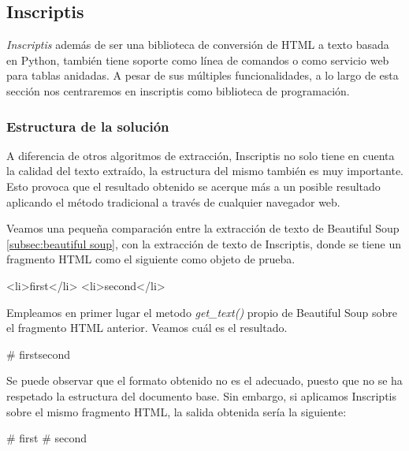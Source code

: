 \subsection{Inscriptis}
\label{subsec:inscriptis}

\emph{Inscriptis} \cite{inscriptis} además de ser una biblioteca de conversión de HTML a texto basada en
Python, también tiene soporte como línea de comandos o como servicio web para tablas anidadas. A pesar de
sus múltiples funcionalidades, a lo largo de esta sección nos centraremos en inscriptis como biblioteca
de programación.

\subsubsection{Estructura de la solución}
\label{subsubsec:estructura de la solucion}

A diferencia de otros algoritmos de extracción, Inscriptis no solo tiene en cuenta la calidad del texto
extraído, la estructura del mismo también es muy importante. Esto provoca que el resultado obtenido se
acerque más a un posible resultado aplicando el método tradicional a través de cualquier navegador web.

Veamos una pequeña comparación entre la extracción de texto de Beautiful Soup \ref{subsec:beautiful soup}, 
con la extracción de texto de Inscriptis, donde se tiene un fragmento HTML como el siguiente como objeto 
de prueba.

\begin{Schunk}
  \begin{Soutput}
      <li>first</li>
      <li>second</li>
  \end{Soutput}
\end{Schunk}

Empleamos en primer lugar el metodo \emph{get\_text()} propio de Beautiful Soup sobre el fragmento HTML
anterior. Veamos cuál es el resultado.

\begin{Schunk}
  \begin{Soutput}
    # firstsecond
  \end{Soutput}
\end{Schunk}

Se puede observar que el formato obtenido no es el adecuado, puesto que no se ha respetado la estructura
del documento base. Sin embargo, si aplicamos Inscriptis sobre el mismo fragmento HTML, la salida obtenida
sería la siguiente:

\begin{Schunk}
  \begin{Soutput}
    # first
    # second
  \end{Soutput}
\end{Schunk}

